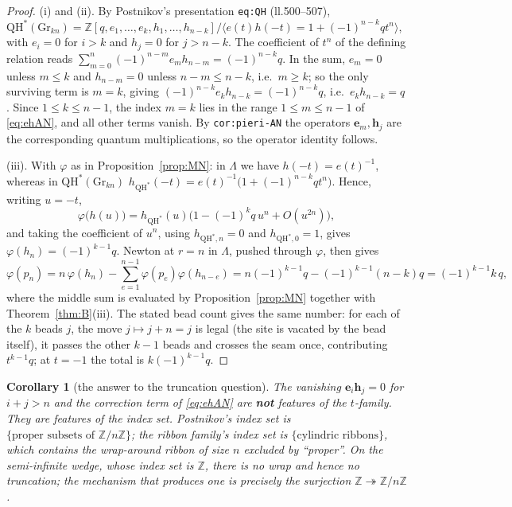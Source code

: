 \documentclass[11pt]{article}
\theoremstyle{plain}
\newtheorem{corollary}[theorem]{Corollary}
\theoremstyle{definition}
\newcommand{\QH}{\mathrm{QH}^*}
\newcommand{\Gr}{\mathrm{Gr}}
\newcommand{\ZZ}{\mathbb{Z}}
\begin{document}
\begin{proof}
(i) and (ii).  By Postnikov's presentation \texttt{eq:QH} (ll.500--507),
$\QH(\Gr_{kn})=\ZZ[q,e_1,\dots,e_k,h_1,\dots,h_{n-k}]/\langle
e(t)h(-t)=1+(-1)^{n-k}qt^n\rangle$, with $e_i=0$ for $i>k$ and $h_j=0$
for $j>n-k$.  The coefficient of $t^n$ of the defining relation reads
$\sum_{m=0}^{n}(-1)^{n-m}e_mh_{n-m}=(-1)^{n-k}q$.  In the sum, $e_m=0$
unless $m\le k$ and $h_{n-m}=0$ unless $n-m\le n-k$, i.e.\ $m\ge k$; so
the only surviving term is $m=k$, giving $(-1)^{n-k}e_kh_{n-k}=(-1)^{n-k}q$,
i.e.\ $e_kh_{n-k}=q$.  Since $1\le k\le n-1$, the index $m=k$ lies in the
range $1\le m\le n-1$ of \eqref{eq:ehAN}, and all other terms vanish.
By \texttt{cor:pieri-AN} the operators $\mathbf e_m,\mathbf h_j$ are the
corresponding quantum multiplications, so the operator identity follows.

(iii).  With $\varphi$ as in Proposition~\ref{prop:MN}: in $\Lambda$ we
have $h(-t)=e(t)^{-1}$, whereas in $\QH(\Gr_{kn})$
$h_{\QH}(-t)=e(t)^{-1}\bigl(1+(-1)^{n-k}qt^n\bigr)$.  Hence, writing
$u=-t$,
\[
\varphi\bigl(h(u)\bigr)=h_{\QH}(u)\bigl(1-(-1)^{k}q\,u^{n}+O(u^{2n})\bigr),
\]
and taking the coefficient of $u^n$, using $h_{\QH,n}=0$ and
$h_{\QH,0}=1$, gives $\varphi(h_n)=(-1)^{k-1}q$.  Newton at $r=n$ in
$\Lambda$, pushed through $\varphi$, then gives
\[
\varphi(p_n)=n\,\varphi(h_n)-\sum_{e=1}^{n-1}\varphi(p_e)\varphi(h_{n-e})
= n(-1)^{k-1}q-(-1)^{k-1}(n-k)q=(-1)^{k-1}k\,q,
\]
where the middle sum is evaluated by Proposition~\ref{prop:MN} together
with Theorem~\ref{thm:B}(iii).  The stated bead count gives the same
number: for each of the $k$ beads $j$, the move $j\mapsto j+n=j$ is legal
(the site is vacated by the bead itself), it passes the other $k-1$ beads
and crosses the seam once, contributing $t^{k-1}q$; at $t=-1$ the total
is $k(-1)^{k-1}q$.
\end{proof}

\begin{corollary}[the answer to the truncation question]
The vanishing $\mathbf e_i\mathbf h_j=0$ for $i+j>n$ and the correction
term of \eqref{eq:ehAN} are \textbf{not} features of the $t$-family.
They are features of the \emph{index set}.  Postnikov's index set is
$\{\text{proper subsets of }\ZZ/n\ZZ\}$; the ribbon family's index set
is $\{\text{cylindric ribbons}\}$, which contains the wrap-around ribbon
of size $n$ excluded by ``proper''.  On the semi-infinite wedge, whose
index set is $\ZZ$, there is no wrap and hence no truncation; the
mechanism that produces one is precisely the surjection
$\ZZ\twoheadrightarrow\ZZ/n\ZZ$.
\end{corollary}
\end{document}

